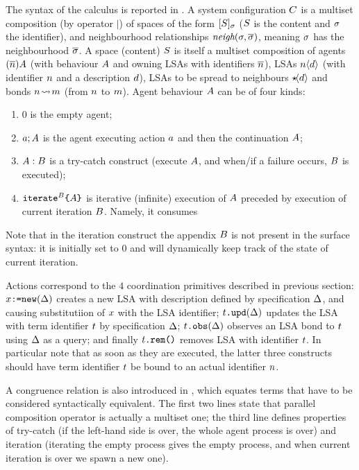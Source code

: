 \documentclass[12pt,a4paper,twoside,openright]{book}
\begin{document}
The syntax of the calculus is reported in . A system configuration $C$ is a multiset composition (by operator $|$) of spaces of the form $[S]_{\sigma}$ ($S$ is the content and $\sigma$ the identifier), and neighbourhood relationships $\textit{neigh}(\sigma,\overline{\sigma})$, meaning $\sigma$ has the neighbourhood $\overline{\sigma}$.
%
A space (content) $S$ is itself a multiset composition of agents $(\overline{n})A$ (with behaviour $A$ and owning LSAs with identifiers $\overline{n}$), LSAs $n\langle d\rangle$ (with identifier $n$ and a description $d$), LSAs to be spread to  neighbours $\star\!\langle d\rangle$ and bonds $n\!\rightsquigarrow \! m$ (from $n$ to $m$).
%
Agent behaviour $A$ can be of four kinds:
\begin{enumerate}
 \item $0$ is the empty agent;
 \item $a ; A$ is the agent executing action $a$ and then the continuation $A$;
 \item $A:B$ is a try-catch construct (execute $A$, and when/if a failure occurs, $B$ is executed);
 \item $\texttt{iterate${}^{B}$\{$A$\}}$ is iterative (infinite) execution of $A$ preceded by execution of current iteration $B$. Namely, it consumes
\end{enumerate}
%
Note that in the iteration construct the appendix $B$ is not present in the surface syntax: it is initially set to $0$ and will dynamically keep track of the state of current iteration.

Actions correspond to the $4$ coordination primitives described in previous section: $x\texttt{:=new}(\Delta)$ creates a new LSA with description defined by specification $\Delta$, and causing substitutiion of $x$ with the LSA identifier; $t\texttt{.upd}(\Delta)$ updates the LSA with term identifier $t$ by specification $\Delta$; $t\texttt{.obs}(\Delta)$ observes an LSA bond to $t$ using $\Delta$ as a query; and finally $t\texttt{.rem()}$ removes LSA with identifier $t$. In particular note that as soon as they are executed, the latter three constructs should have term identifier $t$ be bound to an actual identifier $n$.

A congruence relation is also introduced in , which equates terms that have to be considered syntactically equivalent. The first two lines state that parallel composition operator is actually a multiset one; the third line defines properties of try-catch (if the left-hand side is over, the whole agent process is over) and iteration (iterating the empty process gives the empty process, and when current iteration is over we spawn a new one).
\end{document}
